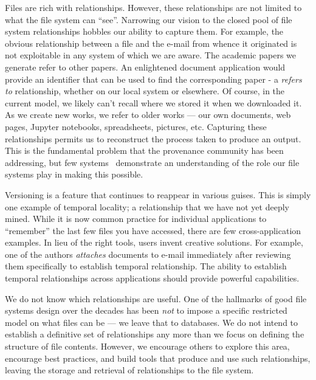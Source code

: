 Files are rich with relationships.  However, these relationships are not limited to what the
file system can ``see''.
Narrowing our vision to the closed pool of file system relationships
hobbles our ability to capture them.
For example, the obvious relationship between
a file and the e-mail from whence it originated is not exploitable in
any system of which we are aware.
The academic papers we generate refer to other papers.  An enlightened document application would provide an identifier that can 
be used to find the corresponding paper - a \textit{refers to} relationship,
whether on our local system or elsewhere.
Of course, in the current model, we likely can't
recall where we stored it when we downloaded it.  As we create new works, we refer to older works --- our own
documents, web pages, Jupyter notebooks, spreadsheets, pictures, etc. Capturing these relationships permits
us to reconstruct the process taken to produce an output.
This is the fundamental problem that the provenance community has been
addressing, but few systems~\cite{pasquier17camflow,reddy06pass} demonstrate
an understanding of the role our file systems play in making this
possible.

Versioning is a feature that continues to reappear in various guises.
This is simply one example of temporal locality; a
relationship that we have not yet deeply mined.
While it is now common practice for
individual applications to ``remember'' the last few files you have accessed,
there are few cross-application examples.
In lieu of the right tools, users invent creative solutions.
For example, one of the authors \textit{attaches} documents to e-mail
immediately after reviewing them
specifically to establish temporal relationship.
The ability to establish temporal relationships across applications should
provide powerful capabilities.

We do not know which relationships are useful. One of the hallmarks of good file systems design over the decades
has been \textit{not} to impose a specific restricted model on what files can be --- we leave that to databases.  
We do not intend to establish a definitive set of relationships any more than we focus on defining
the structure of file contents.
However, we encourage others to explore this area, encourage best practices,
and build tools that produce and use such relationships, leaving the
storage and retrieval of relationships to the file system.


